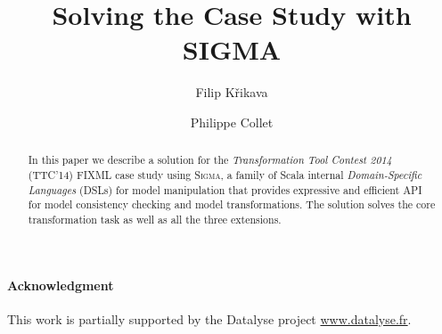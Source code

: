\documentclass[submission]{eptcs}
\title{Solving the \TTC \FIXML Case Study with SIGMA}
\author{
  Filip Křikava
  \institute{University Lille 1 - LIFL, France}
  \institute{INRIA Lille, Nord Europe}
  \email{\href{mailto:filip.krikava@inria.fr}{filip.krikava@inria.fr}}
\and
  Philippe Collet
  \institute{Université Nice - Sophia Antipolis, France}
  \institute{CNRS, I3S, UMR 7271}
  \email{\quad \href{mailto:philippe.collet@unice.fr}{philippe.collet@unice.fr}}
}
\newcommand{\SIGMA}{\textsc{Sigma}\xspace}
\newcommand{\TTC}{TTC'14\xspace}
\begin{document}
\maketitle

\begin{abstract}
In this paper we describe a solution for the \emph{Transformation Tool Contest 2014} (\TTC) FIXML case study using \SIGMA, a family of Scala internal \emph{Domain-Specific Languages} (DSLs) for model manipulation that provides expressive and efficient API for model consistency checking and model transformations.
The solution solves the core transformation task as well as all the three extensions.
\end{abstract}



% 
% 

\paragraph{Acknowledgment}
This work is partially supported by the Datalyse project \url{www.datalyse.fr}.


	

\appendix







\end{document}
